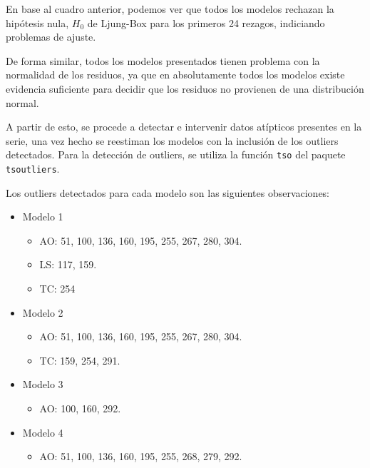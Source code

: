 \documentclass[
  12pt,
]{article}
\providecommand{\tightlist}{%
  \setlength{\itemsep}{0pt}\setlength{\parskip}{0pt}}
\begin{document}
En base al cuadro anterior, podemos ver que todos los modelos rechazan
la hipótesis nula, \(H_0\) de Ljung-Box para los primeros 24 rezagos,
indiciando problemas de ajuste.

De forma similar, todos los modelos presentados tienen problema con la
normalidad de los residuos, ya que en absolutamente todos los modelos
existe evidencia suficiente para decidir que los residuos no provienen
de una distribución normal.

A partir de esto, se procede a detectar e intervenir datos atípticos
presentes en la serie, una vez hecho se reestiman los modelos con la
inclusión de los outliers detectados. Para la detección de outliers, se
utiliza la función \texttt{tso} del paquete \texttt{tsoutliers}.

Los outliers detectados para cada modelo son las siguientes
observaciones:

\begin{itemize}
\tightlist
\item
  Modelo 1

  \begin{itemize}
  \tightlist
  \item
    AO: 51, 100, 136, 160, 195, 255, 267, 280, 304.
  \item
    LS: 117, 159.
  \item
    TC: 254
  \end{itemize}
\item
  Modelo 2

  \begin{itemize}
  \tightlist
  \item
    AO: 51, 100, 136, 160, 195, 255, 267, 280, 304.
  \item
    TC: 159, 254, 291.
  \end{itemize}
\item
  Modelo 3

  \begin{itemize}
  \tightlist
  \item
    AO: 100, 160, 292.
  \end{itemize}
\item
  Modelo 4

  \begin{itemize}
  \tightlist
  \item
    AO: 51, 100, 136, 160, 195, 255, 268, 279, 292.
  \end{itemize}
\end{itemize}
\end{document}
